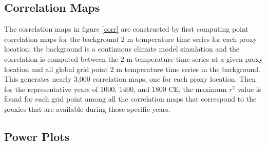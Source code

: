 \documentclass[12pt]{article}
\begin{document}
\subsection{Correlation Maps}
The correlation maps in figure \ref{corr} are constructed by first computing point correlation maps for the background 2 m temperature time series for each proxy location: the background is a continuous climate model simulation and the correlation is computed between the 2 m temperature time series at a given proxy location and all global grid point 2 m temperature time series in the background. This generates nearly 3,000 correlation maps, one for each proxy location. Then for the representative years of 1000, 1400, and 1800 CE, the maximum $r^2$ value is found for each grid point among all the correlation maps that correspond to the proxies that are available during those specific years.

\subsection{Power Plots}




\end{document}
